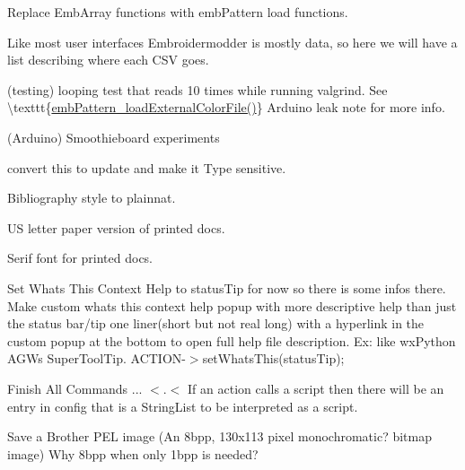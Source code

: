 \begin{DoxyRefList}
\label{todo__todo000193}%
%
Replace Emb\+Array functions with emb\+Pattern load functions.

\label{todo__todo000192}%
%
Like most user interfaces Embroidermodder is mostly data, so here we will have a list describing where each CSV goes.

\label{todo__todo000191}%
%
(testing) looping test that reads 10 times while running valgrind. See \textbackslash{}texttt\{\mbox{\hyperlink{embroidery_8h_a3bf191bd99e2da8d36465f454a4646f6}{emb\+Pattern\+\_\+load\+External\+Color\+File()}}\} Arduino leak note for more info.

\label{todo__todo000190}%
%
(Arduino) Smoothieboard experiments 
\item[Member \mbox{\hyperlink{classGeometry_a1545e793f7715b0886a884790622f847}{Geometry\+::calculate\+Arc\+Data}} (Emb\+Arc arc)]\label{todo__todo000012}%
%
convert this to update and make it Type sensitive.  
\item[Page \mbox{\hyperlink{Ideas}{Ideas}} ]\label{todo__todo000181}%
%
Bibliography style to plainnat.

\label{todo__todo000183}%
%
US letter paper version of printed docs.

\label{todo__todo000182}%
%
Serif font for printed docs. 
\item[Member \mbox{\hyperlink{classMainWindow_a5de9bc12f363ba45fb8082f262d24deb}{Main\+Window\+::create\+All\+Actions}} ()]\label{todo__todo000008}%
%
Set What\textquotesingle{}s This Context Help to status\+Tip for now so there is some infos there. Make custom whats this context help popup with more descriptive help than just the status bar/tip one liner(short but not real long) with a hyperlink in the custom popup at the bottom to open full help file description. Ex\+: like wx\+Python AGW\textquotesingle{}s Super\+Tool\+Tip. ACTION-\/\texorpdfstring{$>$}{>}set\+Whats\+This(status\+Tip); 



Finish All Commands ... \texorpdfstring{$<$}{<}.\texorpdfstring{$<$}{<} If an action calls a script then there will be an entry in config that is a String\+List to be interpreted as a script. 
\item[Member \mbox{\hyperlink{classMdiWindow_a2167cf71975c040208ae05b7b6b10a2f}{Mdi\+Window\+::save\+BMC}} ()]\label{todo__todo000010}%
%
Save a Brother PEL image (An 8bpp, 130x113 pixel monochromatic? bitmap image) Why 8bpp when only 1bpp is needed?


\end{DoxyRefList}
